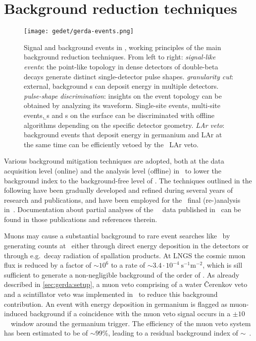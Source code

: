 \section{Background reduction techniques}%
\label{sec:gerda:cuts}

\begin{figure}
  \centering
  \texttt{[image: gedet/gerda-events.png]}
  \caption{%
    Signal and background events in \gerda, working principles of the main background
    reduction techniques. From left to right: \emph{signal-like events}: the point-like
    topology in dense detectors of double-beta decays generate distinct single-detector
    pulse shapes. \emph{granularity cut}: external, background \g{}s can deposit energy
    in multiple detectors. \emph{pulse-shape discrimination}: insights on the event
    topology can be obtained by analyzing its waveform. Single-site events, multi-site
    events, \b{}s and \a{}s on the surface can be discriminated with offline algorithms
    depending on the specific detector geometry. \emph{LAr veto}: background events that
    deposit energy in germanium and LAr at the same time can be efficiently vetoed by
    the \gerda\ LAr veto.
  }\label{fig:gerda:event-types}
\end{figure}

Various background mitigation techniques are adopted, both at the data acquisition level
(online) and the analysis level (offline) in \gerda\ to lower the background index to the
background-free level of \pIIbi. The techniques outlined in the following have been
gradually developed and refined during several years of research and publications, and
have been employed for the \phasetwo\ final (re-)analysis in~\cite{gerda-final}.
Documentation about partial analyses of the \gerda\ \phasetwo\ data published
in~\cite{Agostini2015a, Agostini2017, Agostini2018, Agostini2019a} can be found in those
publications and references therein.

Muons may cause a substantial background to rare event searches like \gerda\ by generating
counts at \qbb\ either through direct energy deposition in the detectors or through
e.g.~decay radiation of spallation products. At LNGS the cosmic muon flux is reduced by a
factor of ${\sim}10^6$ to a rate of ${\sim}3.4 \cdot 10^{−4}~\text{s}^{-1}\text{m}^{-2}$,
which is sill sufficient to generate a non-negligible background of the order of
.  As already described in \cref{sec:gerda:setup}, a muon veto comprising of
a water \v{C}erenkov veto and a scintillator veto was implemented in \gerda\ to reduce
this background contribution. An event with energy deposition in germanium is flagged
as muon-induced background if a coincidence with the muon veto signal occurs in a $\pm
10$~\mus\ window around the germanium trigger. The efficiency of the muon veto system
has been estimated to be of ${\sim}99$\%, leading to a residual background index of
${\sim}$~\cite{Freund2016}.

